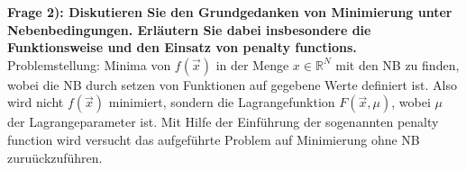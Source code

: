\textbf{Frage 2): Diskutieren Sie den Grundgedanken von Minimierung unter Nebenbedingungen. Erläutern Sie
dabei insbesondere die Funktionsweise und den Einsatz von penalty functions.}\\
Problemstellung: Minima von $f(\vec{x})$ in der Menge $x\in\mathbb{R}^N$ mit den NB zu finden, wobei die NB durch setzen von Funktionen auf gegebene Werte definiert ist.
Also wird nicht $f(\vec{x})$ minimiert, sondern die Lagrangefunktion $F(\vec{x},\mu)$, wobei $\mu$ der Lagrangeparameter ist.
Mit Hilfe der Einführung der sogenannten penalty function wird versucht das aufgeführte Problem auf Minimierung ohne NB zuruückzuführen.
